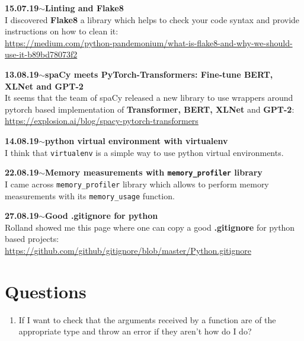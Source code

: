 \documentclass[11pt,a4paper]{article}
\newenvironment{loggentry}[2]%
{\noindent\textbf{#1}\hspace{1cm}$\mathbf{\sim}$\text{ }\textbf{#2}\\}{\vspace{0.5cm}}
\begin{document}
\begin{loggentry}{15.07.19}{Linting and Flake8}

I discovered \textbf{Flake8} a library which helps to check your code syntax and provide instructions on how to clean it:\\
\url{https://medium.com/python-pandemonium/what-is-flake8-and-why-we-should-use-it-b89bd78073f2}

\end{loggentry}


\begin{loggentry}{13.08.19}{spaCy meets PyTorch-Transformers: Fine-tune BERT, XLNet and GPT-2}

It seems that the team of spaCy released a new library to use wrappers around pytorch based implementation of \textbf{Transformer, BERT, XLNet} and \textbf{GPT-2}:\\
\url{https://explosion.ai/blog/spacy-pytorch-transformers}

\end{loggentry}


\begin{loggentry}{14.08.19}{python virtual environment with virtualenv}

I think that \texttt{virtualenv} is a simple way to use python virtual environments.

\end{loggentry}


\begin{loggentry}{22.08.19}{Memory measurements with \texttt{memory\_profiler} library}

I came across \texttt{memory\_profiler} library which allows to perform memory measurements with its \texttt{memory\_usage} function.

\end{loggentry}


\begin{loggentry}{27.08.19}{Good .gitignore for python}

Rolland showed me this page where one can copy a good \textbf{.gitignore} for python based projects:\\
\url{https://github.com/github/gitignore/blob/master/Python.gitignore}

\end{loggentry}


\section{Questions}
\begin{enumerate}
\item If I want to check that the arguments received by a function are of the appropriate type and throw an error if they aren't how do I do?
\end{enumerate}
\end{document}
